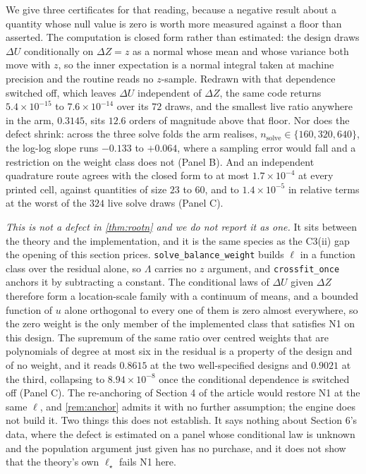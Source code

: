 \documentclass[
  12pt]{article}
\newcommand{\1}[1]{\mathds{1}\left[#1\right]}
\theoremstyle{plain}
\theoremstyle{definition}
\theoremstyle{definition}
\theoremstyle{remark}
\begin{document}
We give three certificates for that reading, because a negative result about a
quantity whose null value is zero is worth more measured against a floor than
asserted. The computation is closed form rather than estimated: the design draws
$\Delta U$ conditionally on $\Delta Z=z$ as a normal whose mean and whose
variance both move with $z$, so the inner expectation is a normal integral taken
at machine precision and the routine reads no $z$-sample. Redrawn with that
dependence switched off, which leaves $\Delta U$ independent of $\Delta Z$, the
same code returns $5.4\times10^{-15}$ to $7.6\times10^{-14}$ over its $72$
draws, and the smallest live ratio anywhere in the arm, $0.3145$, sits $12.6$
orders of magnitude above that floor. Nor does the defect shrink: across the
three solve folds the arm realises,
$n_{\mathrm{solve}}\in\{160,320,640\}$, the log-log slope runs $-0.133$ to
$+0.064$, where a sampling error would fall and a restriction on the weight
class does not (Panel B). And an independent quadrature route agrees with the
closed form to at most $1.7\times10^{-4}$ at every printed cell, against
quantities of size $23$ to $60$, and to $1.4\times10^{-5}$ in relative terms at
the worst of the $324$ live solve draws (Panel C).

\emph{This is not a defect in \cref{thm:rootn} and we do not report it as one.} It
sits between the theory and the implementation, and it is the same species as
the C3(ii) gap the opening of this section prices.
\texttt{solve\_balance\_weight} builds $\ell$ in a function class over the
residual alone, so $\Lambda$ carries no $z$ argument, and
\texttt{crossfit\_once} anchors it by subtracting a constant. The conditional
laws of $\Delta U$ given $\Delta Z$ therefore form a location-scale family with
a continuum of means, and a bounded function of $u$ alone orthogonal to every
one of them is zero almost everywhere, so the zero weight is the only member of
the implemented class that satisfies N1 on this design. The supremum of the same
ratio over centred weights that are polynomials of degree at most six in the
residual is a property of the design and of no weight, and it reads $0.8615$ at
the two well-specified designs and $0.9021$ at the third, collapsing to
$8.94\times10^{-8}$ once the conditional dependence is switched off (Panel C). The re-anchoring of Section 4 of the article would restore N1 at the same $\ell$,
and \cref{rem:anchor} admits it with no
further assumption; the engine does not build it. Two things this does not
establish. It says nothing about Section 6's data, where the defect is estimated
on a panel whose conditional law is unknown and the population argument just
given has no purchase, and it does not show that the theory's own $\ell_\star$
fails N1 here.
\end{document}

